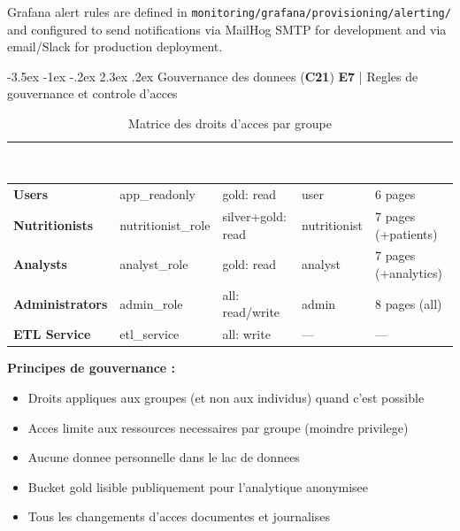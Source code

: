 \documentclass[a4paper,11pt,oneside,openany]{report}
\makeatletter
\renewcommand\section{\@startsection{section}{1}{\z@}%
  {-3.5ex \@plus -1ex \@minus -.2ex}%
  {2.3ex \@plus.2ex}%
  {\normalfont\Large\bfseries\color{ntgreen}}}
\newcommand{\competence}[1]{\textbf{\textcolor{ntgreen}{#1}}}
\newcommand{\evaluation}[1]{\textbf{\textcolor{ntblue}{#1}}}
\makeatother
\begin{document}
Grafana alert rules are defined in \texttt{monitoring/grafana/provisioning/alerting/}
and configured to send notifications via MailHog SMTP for development
and via email/Slack for production deployment.


\section{Gouvernance des donnees (\competence{C21})}
\label{sec:c21}
{\small\evaluation{E7} | Regles de gouvernance et controle d'acces}

\begin{table}[H]
\centering
\caption{Matrice des droits d'acces par groupe}
\label{tab:access-matrix}
\begin{tabularx}{\textwidth}{L{2.3cm} L{2.3cm} L{3.2cm} C{1.5cm} L{3.2cm}}
\toprule
{}
\textcolor{white}{\textbf{Group}} & \textcolor{white}{\textbf{PG Role}} & \textcolor{white}{\textbf{MinIO Policy}} & \textcolor{white}{\textbf{API Role}} & \textcolor{white}{\textbf{Streamlit}} \\
\midrule
\textbf{Users} & app\_readonly & gold: read & user & 6 pages \\
\textbf{Nutritionists} & nutritionist\_role & silver+gold: read & nutritionist & 7 pages (+patients) \\
\textbf{Analysts} & analyst\_role & gold: read & analyst & 7 pages (+analytics) \\
\textbf{Administrators} & admin\_role & all: read/write & admin & 8 pages (all) \\
\textbf{ETL Service} & etl\_service & all: write & --- & --- \\
\bottomrule
\end{tabularx}
\end{table}

\textbf{Principes de gouvernance :}
\begin{itemize}[nosep]
  \item Droits appliques aux groupes (et non aux individus) quand c'est possible
  \item Acces limite aux ressources necessaires par groupe (moindre privilege)
  \item Aucune donnee personnelle dans le lac de donnees
  \item Bucket gold lisible publiquement pour l'analytique anonymisee
  \item Tous les changements d'acces documentes et journalises
\end{itemize}
\end{document}
